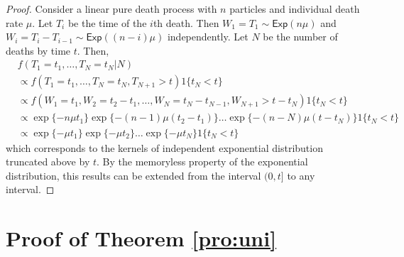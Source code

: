 \documentclass[12pt]{article}
\begin{document}
	\begin{proof}
		Consider a linear pure death process with $n$ particles and individual death rate $\mu$.
		Let $T_i$ be the time of the $i$th death. Then $W_1 = T_1 \sim \textsf{Exp}(n\mu)$ and $W_i = T_i - T_{i-1} \sim \textsf{Exp}((n-i)\mu)$ independently. Let $N$ be the number of deaths by time $t$. Then, 
		\begin{align*}
			& f(T_1 = t_1, \dots, T_N = t_N | N) \\
			& \propto f(T_1 = t_1, \dots, T_N = t_N, T_{N+1} > t) 1\{t_N < t\}\\
			& \propto f(W_1 = t_1, W_2 = t_2 - t_1, \dots, W_N = t_N - t_{N-1}, W_{N+1} > t - t_N) 1\{t_N < t\}\\
			& \propto \exp\{-n\mu t_1\} \exp\{-(n-1)\mu(t_2-t_1)\}\dots \exp\{-(n-N)\mu(t - t_N)\} 1\{t_N < t\}\\
			& \propto \exp\{-\mu t_1\}\exp\{-\mu t_2\} \dots \exp\{-\mu t_N\} 1\{t_N < t\}
		\end{align*}
		which corresponds to the kernels of independent exponential distribution truncated above by $t$. By the memoryless property of the exponential distribution, this results can be extended from the interval $(0, t]$ to any interval.
		
	\end{proof}
	
	
	\section{Proof of Theorem \ref{pro:uni}}
	\label{app:uni}
	
\end{document}

